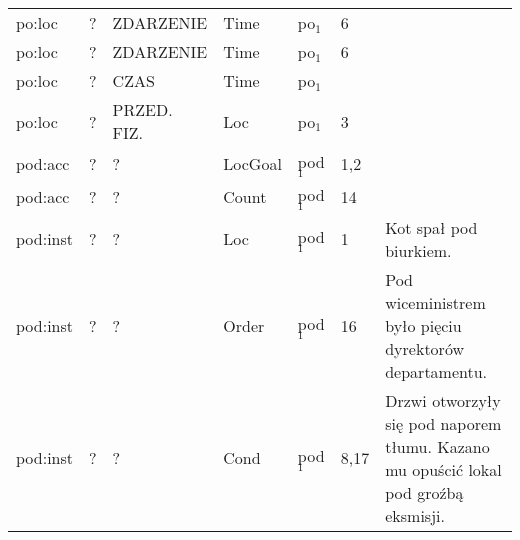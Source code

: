 \documentclass[a4paper, 12pt]{article}
\theoremstyle{remark}
\begin{document}
\begin{sidewaystable}
{\begin{tabular}{|p{2.5cm}|p{1.5cm}|p{2.5cm}|p{2cm}|p{2cm}|p{2cm}|p{10cm}|}
po:loc           & ?                    & ZDARZENIE          & Time            & po$_1$                       & 6                                   &                                                                                                      \\
po:loc           & ?                    & ZDARZENIE          & Time            & po$_1$                       & 6                                   &                                                                                                      \\
po:loc           & ?                    & CZAS               & Time                       & po$_1$                                                  &                                                                                   & \\
po:loc           & ?                    & PRZED. FIZ. & Loc             & po$_1$                       & 3                                          &                                                                                               \\
pod:acc          & ?                    & ?                  & LocGoal         & pod$_1$                      & 1,2                                 &                                                                                                      \\
pod:acc          & ?                    & ?                  & Count           & pod$_1$                      & 14                                  &                                                                                                      \\
pod:inst         & ?                    & ?                    & Loc                & pod$_1$           & 1                          & Kot spał pod biurkiem.                                                                                                                    \\
pod:inst         & ?                    & ?                    & Order              & pod$_1$           & 16                         & Pod wiceministrem było pięciu dyrektorów departamentu.                                                                                    \\
pod:inst         & ?                    & ?                    & Cond               & pod$_1$           & 8,17                       & Drzwi otworzyły się pod naporem tłumu. Kazano mu opuścić lokal pod groźbą eksmisji.                                                      \\
\hline
\end{tabular}%
}
\end{sidewaystable}
\end{document}
